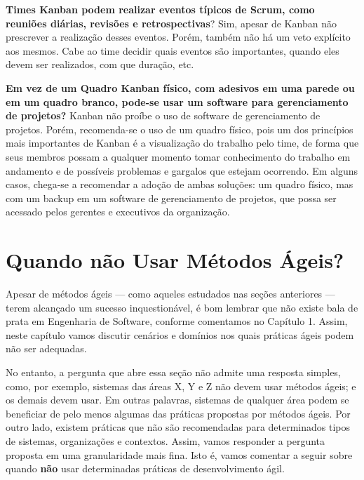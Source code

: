 \documentclass[
  11pt,
  twoside]{book}
\begin{document}
\textbf{Times Kanban podem realizar eventos típicos de Scrum, como
reuniões diárias, revisões e retrospectivas}? Sim, apesar de Kanban não
prescrever a realização desses eventos. Porém, também não há um veto
explícito aos mesmos. Cabe ao time decidir quais eventos são
importantes, quando eles devem ser realizados, com que duração, etc.

\textbf{Em vez de um Quadro Kanban físico, com adesivos em uma parede ou
em um quadro branco, pode-se usar um software para gerenciamento de
projetos?} Kanban não proíbe o uso de software de gerenciamento de
projetos. Porém, recomenda-se o uso de um quadro físico, pois um dos
princípios mais importantes de Kanban é a visualização do trabalho pelo
time, de forma que seus membros possam a qualquer momento tomar
conhecimento do trabalho em andamento e de possíveis problemas e
gargalos que estejam ocorrendo. Em alguns casos, chega-se a recomendar a
adoção de ambas soluções: um quadro físico, mas com um backup em um
software de gerenciamento de projetos, que possa ser acessado pelos
gerentes e executivos da organização.

\hypertarget{quando-nuxe3o-usar-muxe9todos-uxe1geis}{%
\section{Quando não Usar Métodos
Ágeis?}\label{quando-nuxe3o-usar-muxe9todos-uxe1geis}}

 Apesar de métodos ágeis --- como aqueles estudados
nas seções anteriores --- terem alcançado um sucesso inquestionável, é
bom lembrar que não existe bala de prata em Engenharia de Software,
conforme comentamos no Capítulo 1. Assim, neste capítulo vamos discutir
cenários e domínios nos quais práticas ágeis podem não ser adequadas.

No entanto, a pergunta que abre essa seção não admite uma resposta
simples, como, por exemplo, sistemas das áreas X, Y e Z não devem usar
métodos ágeis; e os demais devem usar. Em outras palavras, sistemas de
qualquer área podem se beneficiar de pelo menos algumas das práticas
propostas por métodos ágeis. Por outro lado, existem práticas que não
são recomendadas para determinados tipos de sistemas, organizações e
contextos. Assim, vamos responder a pergunta proposta em uma
granularidade mais fina. Isto é, vamos comentar a seguir sobre quando
\textbf{não} usar determinadas práticas de desenvolvimento ágil.
\end{document}
